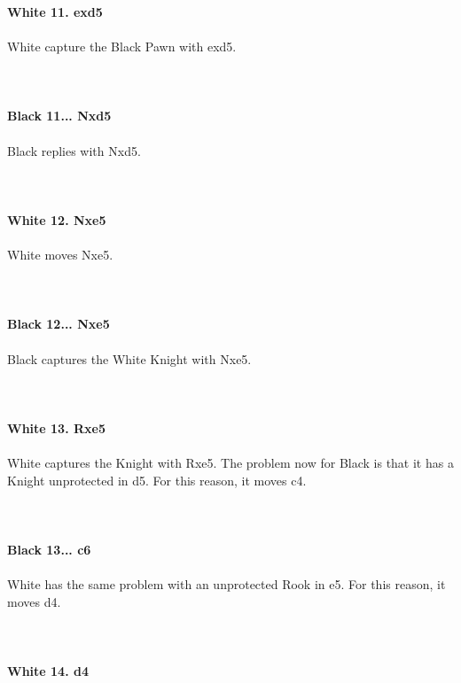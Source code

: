 \documentclass{article}
\begin{document}
\\

\\
\\
\textbf{White 11. exd5}\\
\\
White capture the Black Pawn with exd5.\\
\\

\\
\\
\textbf{Black 11... Nxd5}\\
\\
Black replies with Nxd5.\\
\\

\\
\\
\textbf{White 12. Nxe5}\\
\\
White moves Nxe5.\\
\\

\\
\\
\textbf{Black 12... Nxe5}\\
\\
Black captures the White Knight with Nxe5.\\
\\

\\
\\
\textbf{White 13. Rxe5}\\
\\
White captures the Knight with Rxe5. The problem now for Black is that it has a Knight unprotected in d5. For this reason, it moves c4.\\
\\

\\
\\
\textbf{Black 13... c6}\\
\\
White has the same problem with an unprotected Rook in e5. For this reason, it moves d4.\\
\\

\\
\\
\textbf{White 14. d4}\\
\end{document}
